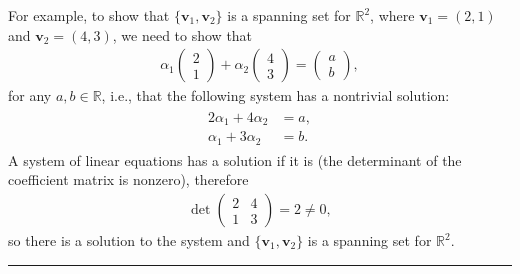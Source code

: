 \documentclass[letterpaper,10pt,english]{jupyterBook}
\begin{document}
\sphinxAtStartPar
For example, to show that \(\{ \mathbf{v}_1, \mathbf{v}_2 \}\) is a spanning set for \(\mathbb{R}^2\), where \(\mathbf{v}_1 = (2, 1)\) and \(\mathbf{v}_2 = (4, 3)\), we need to show that
\begin{equation*}
\begin{split}\alpha_1 \begin{pmatrix} 2\\ 1 \end{pmatrix} + \alpha_2 \begin{pmatrix} 4 \\ 3 \end{pmatrix} = \begin{pmatrix} a\\ b \end{pmatrix},\end{split}
\end{equation*}
\sphinxAtStartPar
for any \(a, b \in \mathbb{R}\), i.e., that the following system has a non\sphinxhyphen{}trivial solution:
\begin{equation*}
\begin{split} \begin{align*}
    2 \alpha_1 + 4 \alpha_2 &= a, \\
    \alpha_1 + 3 \alpha_2 &= b.
\end{align*} \end{split}
\end{equation*}
\sphinxAtStartPar
A system of linear equations has a solution if it is {\hyperref[\detokenize{_pages/1.5_Inverse_matrix:inverse-matrix-definition}]{}} (the determinant of the coefficient matrix is non\sphinxhyphen{}zero), therefore
\begin{equation*}
\begin{split} \det \begin{pmatrix} 2 & 4 \\ 1 & 3 \end{pmatrix} = 2 \neq 0, \end{split}
\end{equation*}
\sphinxAtStartPar
so there is a solution to the system and \(\{\mathbf{v}_1, \mathbf{v}_2\}\) is a spanning set for \(\mathbb{R}^2\).


\bigskip\hrule\bigskip
\end{document}
